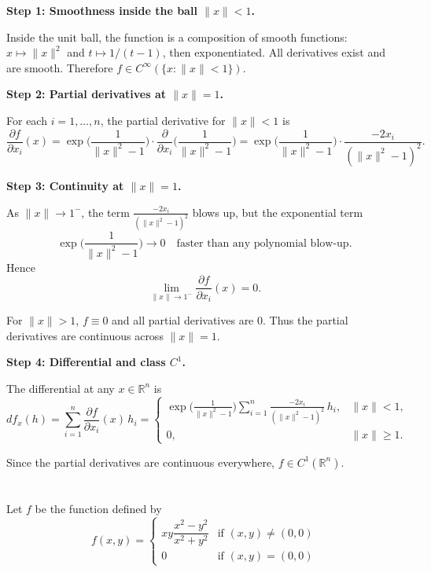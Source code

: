 \documentclass[12pt]{article}
\begin{document}
\begin{correctionbox}
\textbf{Step 1: Smoothness inside the ball \(\|x\|<1\).}  

Inside the unit ball, the function is a composition of smooth functions: \(x\mapsto \|x\|^2\) and \(t\mapsto 1/(t-1)\), then exponentiated. All derivatives exist and are smooth. Therefore \(f\in C^\infty(\{x:\|x\|<1\})\).

\medskip
\textbf{Step 2: Partial derivatives at \(\|x\|=1\).}  

For each \(i=1,\dots,n\), the partial derivative for \(\|x\|<1\) is
\[
\frac{\partial f}{\partial x_i}(x)
= \exp\!\Big(\frac{1}{\|x\|^2-1}\Big)\cdot \frac{\partial}{\partial x_i}\Big(\frac{1}{\|x\|^2-1}\Big)
= \exp\Big(\frac{1}{\|x\|^2-1}\Big)\cdot \frac{-2x_i}{(\|x\|^2-1)^2}.
\]

\medskip
\textbf{Step 3: Continuity at \(\|x\|=1\).}  

As \(\|x\|\to 1^-\), the term \(\frac{-2x_i}{(\|x\|^2-1)^2}\) blows up, but the exponential term
\[
\exp\Big(\frac{1}{\|x\|^2-1}\Big) \to 0 \quad \text{faster than any polynomial blow-up.}
\]
Hence
\[
\lim_{\|x\|\to 1^-} \frac{\partial f}{\partial x_i}(x) = 0.
\]

For \(\|x\|>1\), \(f\equiv 0\) and all partial derivatives are 0. Thus the partial derivatives are continuous across \(\|x\|=1\).

\medskip
\textbf{Step 4: Differential and class \(C^1\).}  

The differential at any \(x\in\mathbb{R}^n\) is
\[
\boxed{
df_x(h) = \sum_{i=1}^{n} \frac{\partial f}{\partial x_i}(x)\, h_i 
= \begin{cases}
\displaystyle \exp\Big(\frac{1}{\|x\|^2-1}\Big) \sum_{i=1}^{n} \frac{-2x_i}{(\|x\|^2-1)^2} \, h_i, & \|x\|<1,\\[0.5em]
0, & \|x\|\ge 1.
\end{cases}
}
\]

Since the partial derivatives are continuous everywhere, \(f\in C^1(\mathbb{R}^n)\).
\end{correctionbox}

\section{}
Let $f$ be the function defined by
$$f(x, y) = \begin{cases}
xy\dfrac{x^2 - y^2}{x^2 + y^2} & \text{if } (x, y) \neq (0, 0) \\[0.5em]
0 & \text{if } (x, y) = (0, 0)
\end{cases}$$
\end{document}
